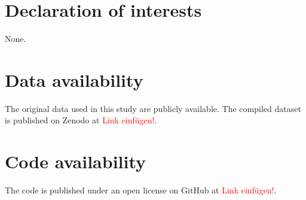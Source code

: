 \documentclass[review]{elsarticle}
\begin{document}
\section*{Declaration of interests}
None.
\section*{Data availability}
The original data used in this study are publicly available. The compiled dataset is published on Zenodo at \textcolor{red}{Link einfügen!}. 
\section*{Code availability}
The code is published under an open license on GitHub at \textcolor{red}{Link einfügen!}. 


\appendix
\setcounter{table}{0}
\setcounter{figure}{0}
\end{document}
